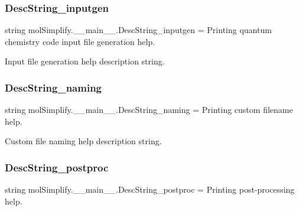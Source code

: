 \subsubsection{\texorpdfstring{Desc\+String\+\_\+inputgen}{DescString\_inputgen}}
{\footnotesize\ttfamily string mol\+Simplify.\+\_\+\+\_\+main\+\_\+\+\_\+.\+Desc\+String\+\_\+inputgen = \textquotesingle{}Printing quantum chemistry code input file generation help.\textquotesingle{}}



Input file generation help description string. 

\mbox{\label{namespacemolSimplify_1_1____main_____a8f8d451490e4ae14efb40374fd9774f2}} 
\subsubsection{\texorpdfstring{Desc\+String\+\_\+naming}{DescString\_naming}}
{\footnotesize\ttfamily string mol\+Simplify.\+\_\+\+\_\+main\+\_\+\+\_\+.\+Desc\+String\+\_\+naming = \textquotesingle{}Printing custom filename help.\textquotesingle{}}



Custom file naming help description string. 

\mbox{\label{namespacemolSimplify_1_1____main_____aa19f048e1fe6ed31edc79a7f0ab58982}} 
\subsubsection{\texorpdfstring{Desc\+String\+\_\+postproc}{DescString\_postproc}}
{\footnotesize\ttfamily string mol\+Simplify.\+\_\+\+\_\+main\+\_\+\+\_\+.\+Desc\+String\+\_\+postproc = \textquotesingle{}Printing post-\/processing help.\textquotesingle{}}



